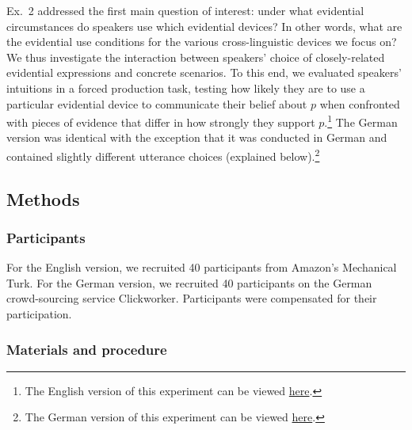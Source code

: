 \documentclass[11pt]{article}
\begin{document}
Ex.~2 addressed the first main question of interest: under what evidential circumstances do speakers use which evidential devices? In other words, what are the evidential use conditions for the various cross-linguistic devices we focus on? We thus investigate the interaction between speakers’ choice of closely-related evidential expressions and concrete scenarios.  To this end, we evaluated speakers' intuitions in a forced production task, testing how likely they are to use a particular evidential device to communicate their belief about $p$ when confronted with pieces of evidence that differ in how strongly they support $p$.\footnote{The English version of this experiment can be viewed \href{http://stanford.edu/~jdegen/71_modals_forced_production/modals.html}{here}.} The German version was identical with the exception that it was conducted in German and contained slightly different utterance choices (explained below).\footnote{The German version of this experiment can be viewed \href{http://web.stanford.edu/~jdegen/cgi-bin/3_dp_production/modals.html}{here}.}

\subsection{Methods}

\subsubsection{Participants}

For the English version, we recruited 40 participants from Amazon's Mechanical Turk. For the German version, we recruited 40 participants on the German crowd-sourcing service Clickworker. Participants were compensated for their participation.

\subsubsection{Materials and procedure}
\end{document}
